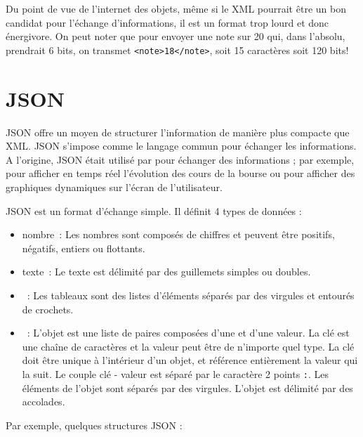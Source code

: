Du point de vue de l’internet des objets, même si le XML pourrait être un bon candidat pour l’échange d’informations, il est un format trop lourd et donc énergivore. On peut noter que pour envoyer une note sur 20 qui, dans l'absolu, prendrait 6 bits, on transmet \texttt{<note>18</note>}, soit 15 caractères soit 120 bits! 

\section{JSON}

 \begin{figure}
\end{figure}

\ac{JSON}  offre un moyen de structurer l’information de manière plus compacte que \ac{XML}. JSON s’impose comme le langage commun pour échanger les informations. A l’origine, JSON était utilisé par pour échanger des informations ; par exemple, pour afficher en temps réel l’évolution des cours de la bourse ou pour afficher des graphiques dynamiques sur l’écran de l’utilisateur.

JSON  est un format d’échange simple. Il définit 4 types de données :

\begin{itemize}
    \item nombre~: Les nombres sont composés de chiffres et peuvent être positifs, négatifs, entiers ou flottants.
    \item texte~: Le texte est délimité par des guillemets simples ou doubles.
    \item {}~: Les tableaux sont des listes d’éléments séparés par des virgules et entourés de crochets.
    \item {}~: L’objet est une liste de paires composées d’une  et d’une valeur. La clé est une chaîne de caractères et la valeur peut être de n’importe quel type. La clé doit être unique à l’intérieur d’un objet, et référence entièrement la valeur qui la suit. Le couple clé - valeur est séparé par le caractère 2 points  \texttt{:}. Les éléments de l’objet sont séparés par des virgules. L'objet est délimité par des accolades.
\end{itemize}

Par exemple, quelques structures \ac{JSON} :

